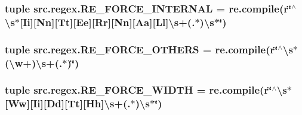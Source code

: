 \hypertarget{namespacesrc_1_1regex_a3b341c15a86da2a7eb9973c76fda4990}{
\subsubsection[{R\-E\-\_\-\-F\-O\-R\-C\-E\-\_\-\-I\-N\-T\-E\-R\-N\-A\-L}]{\setlength{\rightskip}{0pt plus 5cm}tuple src.\-regex.\-R\-E\-\_\-\-F\-O\-R\-C\-E\-\_\-\-I\-N\-T\-E\-R\-N\-A\-L = re.\-compile(r\char`\"{}$^\wedge$\textbackslash{}s$\ast$\mbox{[}Ii\mbox{]}\mbox{[}Nn\mbox{]}\mbox{[}Tt\mbox{]}\mbox{[}Ee\mbox{]}\mbox{[}Rr\mbox{]}\mbox{[}Nn\mbox{]}\mbox{[}Aa\mbox{]}\mbox{[}Ll\mbox{]}\textbackslash{}s+(.$\ast$)\textbackslash{}s$\ast$\char`\"{})}}\label{namespacesrc_1_1regex_a3b341c15a86da2a7eb9973c76fda4990}
\hypertarget{namespacesrc_1_1regex_a8b026bb1e7c8c0a755cb6a6efb27adff}{
\subsubsection[{R\-E\-\_\-\-F\-O\-R\-C\-E\-\_\-\-O\-T\-H\-E\-R\-S}]{\setlength{\rightskip}{0pt plus 5cm}tuple src.\-regex.\-R\-E\-\_\-\-F\-O\-R\-C\-E\-\_\-\-O\-T\-H\-E\-R\-S = re.\-compile(r\char`\"{}$^\wedge$\textbackslash{}s$\ast$(\textbackslash{}w+)\textbackslash{}s+(.$\ast$)\char`\"{})}}\label{namespacesrc_1_1regex_a8b026bb1e7c8c0a755cb6a6efb27adff}
\hypertarget{namespacesrc_1_1regex_a6af1e507594bdc8b84ec16f8a4722d5b}{
\subsubsection[{R\-E\-\_\-\-F\-O\-R\-C\-E\-\_\-\-W\-I\-D\-T\-H}]{\setlength{\rightskip}{0pt plus 5cm}tuple src.\-regex.\-R\-E\-\_\-\-F\-O\-R\-C\-E\-\_\-\-W\-I\-D\-T\-H = re.\-compile(r\char`\"{}$^\wedge$\textbackslash{}s$\ast$\mbox{[}Ww\mbox{]}\mbox{[}Ii\mbox{]}\mbox{[}Dd\mbox{]}\mbox{[}Tt\mbox{]}\mbox{[}Hh\mbox{]}\textbackslash{}s+(.$\ast$)\textbackslash{}s$\ast$\char`\"{})}}\label{namespacesrc_1_1regex_a6af1e507594bdc8b84ec16f8a4722d5b}
